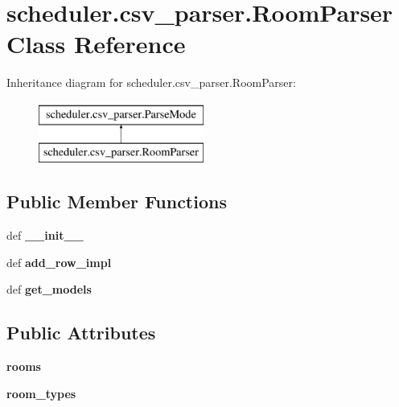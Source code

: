 \hypertarget{classscheduler_1_1csv__parser_1_1_room_parser}{\section{scheduler.\-csv\-\_\-parser.\-Room\-Parser Class Reference}
\label{classscheduler_1_1csv__parser_1_1_room_parser}
}
Inheritance diagram for scheduler.\-csv\-\_\-parser.\-Room\-Parser\-:\begin{figure}[H]
\begin{center}
\leavevmode
\includegraphics[height=2.000000cm]{classscheduler_1_1csv__parser_1_1_room_parser}
\end{center}
\end{figure}
\subsection*{Public Member Functions}
\begin{DoxyCompactItemize}
\item 
\hypertarget{classscheduler_1_1csv__parser_1_1_room_parser_a51d19b910c837d113ec19c65e8374da8}{def {\bfseries \-\_\-\-\_\-init\-\_\-\-\_\-}}\label{classscheduler_1_1csv__parser_1_1_room_parser_a51d19b910c837d113ec19c65e8374da8}

\item 
\hypertarget{classscheduler_1_1csv__parser_1_1_room_parser_a25e2ef8c3ff490928f6c3cffab628fbb}{def {\bfseries add\-\_\-row\-\_\-impl}}\label{classscheduler_1_1csv__parser_1_1_room_parser_a25e2ef8c3ff490928f6c3cffab628fbb}

\item 
\hypertarget{classscheduler_1_1csv__parser_1_1_room_parser_a3c5441a568b7a15955b351d0016e388f}{def {\bfseries get\-\_\-models}}\label{classscheduler_1_1csv__parser_1_1_room_parser_a3c5441a568b7a15955b351d0016e388f}

\end{DoxyCompactItemize}
\subsection*{Public Attributes}
\begin{DoxyCompactItemize}
\item 
\hypertarget{classscheduler_1_1csv__parser_1_1_room_parser_adcc8d7d3782ebaadbcc4ece558bf4fad}{{\bfseries rooms}}\label{classscheduler_1_1csv__parser_1_1_room_parser_adcc8d7d3782ebaadbcc4ece558bf4fad}

\item 
\hypertarget{classscheduler_1_1csv__parser_1_1_room_parser_a799d0bcbd8a603e56732004b84875a74}{{\bfseries room\-\_\-types}}\label{classscheduler_1_1csv__parser_1_1_room_parser_a799d0bcbd8a603e56732004b84875a74}

\end{DoxyCompactItemize}
